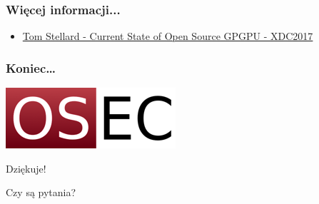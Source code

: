 \documentclass[dvipsnames,table]{beamer}
\begin{document}
\begin{frame}
\frametitle{Więcej informacji...}
\begin{itemize}
	\item \href{https://www.x.org/wiki/Events/XDC2017/Stellard_GPGPU.pdf}{Tom Stellard - Current State of Open Source GPGPU - XDC2017}
\end{itemize}
\end{frame}

\begin{frame}
\frametitle{Koniec\ldots}
\begin{center}
\includegraphics[scale=0.5]{img-oseclogo.png}

Dziękuje!

Czy są pytania?

\end{center}
\end{frame}
\end{document}
